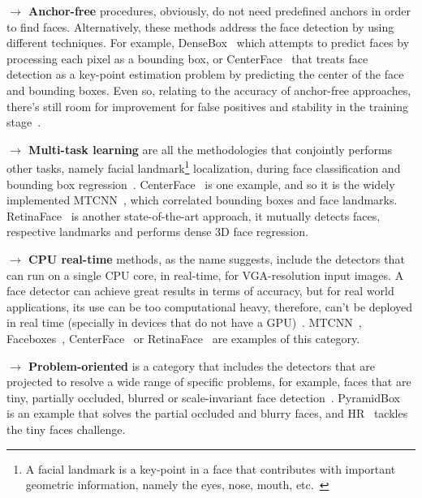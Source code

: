 \documentclass[class=report, crop=false, a4paper, 12pt]{standalone}
\begin{document}
\begin{appendix}
\vspace{0.7\baselineskip}
\noindent\textbf{$\rightarrow$ Anchor-free} procedures, obviously, do not need predefined anchors in order to find faces. Alternatively, these methods address the face detection by using different techniques. For example, DenseBox~\autocite{huangDenseBoxUnifyingLandmark2015} which attempts to predict faces by processing each pixel as a bounding box, or CenterFace~\autocite{xuCenterFaceJointFace2019} that treats face detection as a key-point estimation problem by predicting the center of the face and bounding boxes. Even so, relating to the accuracy of anchor-free approaches, there's still room for improvement for false positives and stability in the training stage~\autocite{duElementsEndtoendDeep2022}.

\vspace{0.7\baselineskip}
\noindent\textbf{$\rightarrow$ Multi-task learning} are all the methodologies that conjointly performs other tasks, namely facial landmark\footnote{A facial landmark is a key-point in a face that contributes with important geometric information, namely the eyes, nose, mouth, etc.~\autocite{fengWingLossRobust2018}} localization, during face classification and bounding box regression~\autocite{duElementsEndtoendDeep2022}. CenterFace~\autocite{xuCenterFaceJointFace2019} is one example, and so it is the widely implemented MTCNN~\autocite{zhangJointFaceDetection2016a}, which correlated bounding boxes and face landmarks. RetinaFace~\autocite{dengRetinaFaceSinglestageDense2019} is another state-of-the-art approach, it mutually detects faces, respective landmarks and performs dense 3D face regression.

\vspace{0.7\baselineskip}
\noindent\textbf{$\rightarrow$ CPU real-time} methods, as the name suggests, include the detectors that can run on a single CPU core, in real-time, for VGA-resolution input images. A face detector can achieve great results in terms of accuracy, but for real world applications, its use can be too computational heavy, therefore, can't be deployed in real time (specially in devices that do not have a GPU)~\autocite{duElementsEndtoendDeep2022}. MTCNN~\autocite{zhangJointFaceDetection2016a}, Faceboxes~\autocite{zhangFaceBoxesCPURealtime2018}, CenterFace~\autocite{xuCenterFaceJointFace2019} or RetinaFace~\autocite{dengRetinaFaceSinglestageDense2019} are examples of this category.

\vspace{0.7\baselineskip}
\noindent\textbf{$\rightarrow$ Problem-oriented} is a category that includes the detectors that are projected to resolve a wide range of specific problems, for example, faces that are tiny, partially occluded, blurred or scale-invariant face detection~\autocite{duElementsEndtoendDeep2022}. PyramidBox~\autocite{tangPyramidBoxContextassistedSingle2018} is an example that solves the partial occluded and blurry faces, and HR~\autocite{huFindingTinyFaces2017} tackles the tiny faces challenge.



\end{appendix}
\end{document}
